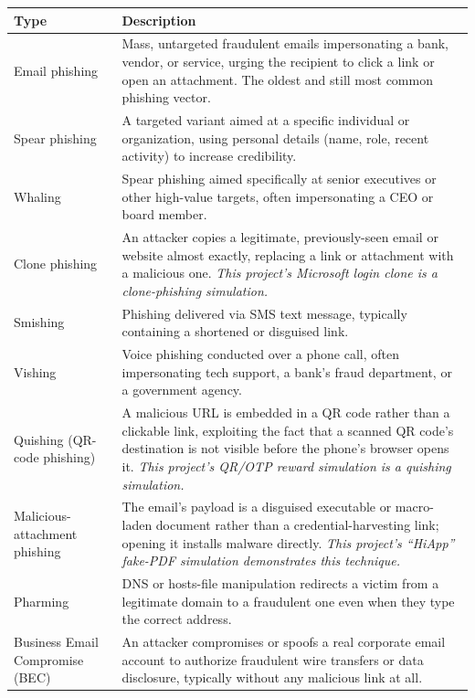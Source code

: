 \documentclass[11pt,a4paper]{report}
\begin{document}
\begin{longtable}{@{}p{3.3cm}p{11.5cm}@{}}
\toprule
\textbf{Type} & \textbf{Description} \\
\midrule
\endhead
Email phishing & Mass, untargeted fraudulent emails impersonating a bank, vendor, or
service, urging the recipient to click a link or open an attachment. The oldest and
still most common phishing vector. \\[4pt]
Spear phishing & A targeted variant aimed at a specific individual or organization,
using personal details (name, role, recent activity) to increase credibility. \\[4pt]
Whaling & Spear phishing aimed specifically at senior executives or other
high-value targets, often impersonating a CEO or board member. \\[4pt]
Clone phishing & An attacker copies a legitimate, previously-seen email or website
almost exactly, replacing a link or attachment with a malicious one. \emph{This
project's Microsoft login clone is a clone-phishing simulation.} \\[4pt]
Smishing & Phishing delivered via SMS text message, typically containing a
shortened or disguised link. \\[4pt]
Vishing & Voice phishing conducted over a phone call, often impersonating tech
support, a bank's fraud department, or a government agency. \\[4pt]
Quishing (QR-code phishing) & A malicious URL is embedded in a QR code rather than a
clickable link, exploiting the fact that a scanned QR code's destination is not
visible before the phone's browser opens it. \emph{This project's QR/OTP reward
simulation is a quishing simulation.} \\[4pt]
Malicious-attachment phishing & The email's payload is a disguised executable or
macro-laden document rather than a credential-harvesting link; opening it installs
malware directly. \emph{This project's ``HiApp'' fake-PDF simulation demonstrates
this technique.} \\[4pt]
Pharming & DNS or hosts-file manipulation redirects a victim from a legitimate
domain to a fraudulent one even when they type the correct address. \\[4pt]
Business Email Compromise (BEC) & An attacker compromises or spoofs a real
corporate email account to authorize fraudulent wire transfers or data disclosure,
typically without any malicious link at all. \\
\bottomrule
\end{longtable}
\end{document}
